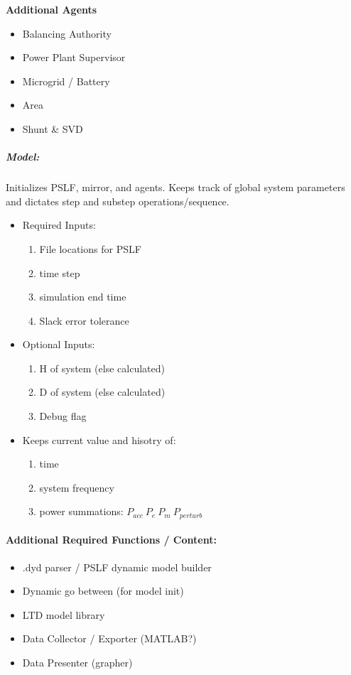 \documentclass[12pt]{article}
\begin{document}
\begin{minipage}[t]{.5\textwidth}
\end{minipage} \hspace{1 em}\begin{minipage}[t]{.5\textwidth}
\textbf{Additional Agents}
\begin{itemize}
	\item Balancing Authority
	\item Power Plant Supervisor
	\item Microgrid / Battery
	\item Area
	\item Shunt \& SVD
\end{itemize}
\subparagraph{Model:} Initializes PSLF, mirror, and agents. Keeps track of global system parameters and dictates step and substep operations/sequence.
\begin{itemize}
	\item Required Inputs:
	\begin{enumerate}
		\item File locations for PSLF
		\item time step
		\item simulation end time
		\item Slack error tolerance
	\end{enumerate}
	\item Optional Inputs:
	\begin{enumerate}
		\item H of system (else calculated)
		\item D of system (else calculated)
		\item Debug flag
	\end{enumerate}
	\item Keeps current value and hisotry of:
	\begin{enumerate}
		\item time
		\item system frequency
		\item power summations:  $P_{acc} \ P_{e} \ P_{m} \ P_{perturb}$
	\end{enumerate}
\end{itemize}
\paragraph{Additional Required Functions / Content:}
\begin{itemize}
	\item .dyd parser / PSLF dynamic model builder
	\item Dynamic go between (for model init)
	\item LTD model library
	\item Data Collector / Exporter (MATLAB?)
	\item Data Presenter (grapher)
\end{itemize}
\end{minipage}
\end{document}

